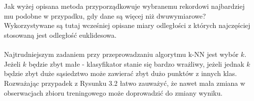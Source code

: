 \documentclass[12pt,a4paper]{report}
\begin{document}
\\
\\Jak wyżej opisana metoda przyporządkowuje wybranemu rekordowi najbardziej mu podobne w przypadku, gdy dane są więcej niż dwuwymiarowe?
\\Wykorzystywane są tutaj wcześniej opisane miary odległości z których najczęściej stosowaną jest odległość euklidesowa.
\\
\\Najtrudniejszym zadaniem przy przeprowadzaniu algorytmu k-NN jest wybór $k$. Jeżeli $k$ będzie zbyt małe - klasyfikator stanie się bardzo wrażliwy, jeżeli jednak $k$ będzie zbyt duże sąsiedztwo może zawierać zbyt dużo punktów z innych klas. Rozważając przypadek z Rysunku 3.2 łatwo zauważyć, że nawet mała zmiana w obserwacjach zbioru treningowego może doprowadzić do zmiany wyniku.
\end{document}
